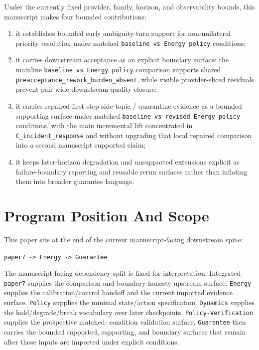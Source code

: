 \documentclass[11pt]{article}
\begin{document}
Under the currently fixed provider, family, horizon, and observability bounds,
this manuscript makes four bounded contributions:

\begin{enumerate}
\item it establishes bounded early ambiguity-turn support for non-unilateral
priority resolution under matched \texttt{baseline vs Energy policy}
conditions;
\item it carries downstream acceptance as an explicit boundary surface: the
mainline \texttt{baseline vs Energy policy} comparison supports shared
\texttt{preacceptance\_rework\_burden\_absent}, while visible provider-sliced
residuals prevent pair-wide downstream-quality closure;
\item it carries repaired first-step side-topic / quarantine evidence as a
bounded supporting surface under matched
\texttt{baseline vs revised Energy policy} conditions, with the main
incremental lift concentrated in \texttt{C\_incident\_response} and without
upgrading that local repaired comparison into a second manuscript supported
claim;
\item it keeps later-horizon degradation and unsupported extensions explicit as
failure-boundary reporting and reusable rerun surfaces rather than inflating
them into broader guarantee language.
\end{enumerate}

\section{Program Position And Scope}

This paper sits at the end of the current manuscript-facing downstream spine:

\begin{center}
\texttt{paper7 -> Energy -> Guarantee}
\end{center}

\noindent The manuscript-facing dependency split is fixed for interpretation.
Integrated \texttt{paper7} supplies the comparison-and-boundary-honesty
upstream surface. \texttt{Energy} supplies the calibration/control handoff and
the current imported evidence surface.
\texttt{Policy} supplies the minimal state/action specification.
\texttt{Dynamics} supplies the hold/degrade/break vocabulary over later
checkpoints. \texttt{Policy-Verification} supplies the prospective matched-
condition validation surface. \texttt{Guarantee} then carries the bounded
supported, supporting, and boundary surfaces that remain after those inputs are
imported under explicit conditions.
\end{document}
